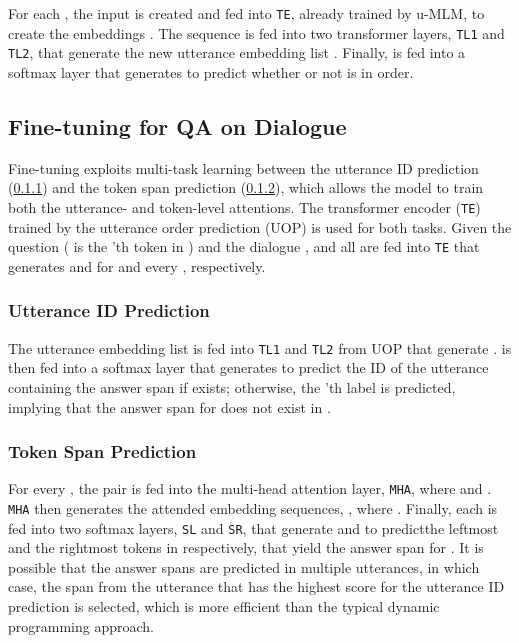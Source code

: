 \documentclass[11pt,a4paper]{article}
\newcommand{\textsec}[1]{\textsection\ref{#1}}
\newcommand{\LN}{\linebreak\noindent}
\begin{document}
For each , the input  is created and fed into \texttt{TE}, already trained by u-MLM, to create the embeddings .
The sequence  is fed into two transformer layers, \texttt{TL1} and \texttt{TL2}, that generate the new utterance embedding list .
Finally,  is fed into a softmax layer that generates  to predict whether or not  is in order.





\subsection{Fine-tuning for QA on Dialogue}
\label{ssec:finetuning}

Fine-tuning exploits multi-task learning between the utterance ID prediction (\textsec{sssec:finetuning-1}) and the token span prediction (\textsec{sssec:finetuning-2}), which allows the model to train both the utterance- and token-level attentions.
The transformer encoder (\texttt{TE}) trained by the utterance order prediction (UOP) is used for both tasks.
Given the question   ( is the 'th token in ) and the dialogue ,  and all  are fed into \texttt{TE} that generates  and  for  and every , respectively.










\subsubsection{Utterance ID Prediction}
\label{sssec:finetuning-1}

The utterance embedding list  is fed into \texttt{TL1} and \texttt{TL2} from UOP  that generate .
 is then fed into a softmax layer that generates  to predict the ID of the utterance containing the answer span if exists; otherwise, the 'th label is predicted, implying that the answer span for  does not exist in .





\subsubsection{Token Span Prediction}
\label{sssec:finetuning-2}

For every , the pair  is fed into the multi-head attention layer, \texttt{MHA}, where  and .
\texttt{MHA} \cite{vaswani_2017} then generates the attended embedding sequences, , where .
Finally, each  is fed into two softmax layers, \texttt{SL} and \texttt{SR}, that generate  and  to predict\LN the leftmost and the rightmost tokens in  respectively, that yield the answer span for .
It is possible that the answer spans are predicted in multiple utterances, in which case, the span from the utterance that has the highest score for the utterance ID prediction is selected, which is more efficient than the typical dynamic programming approach.
\end{document}
